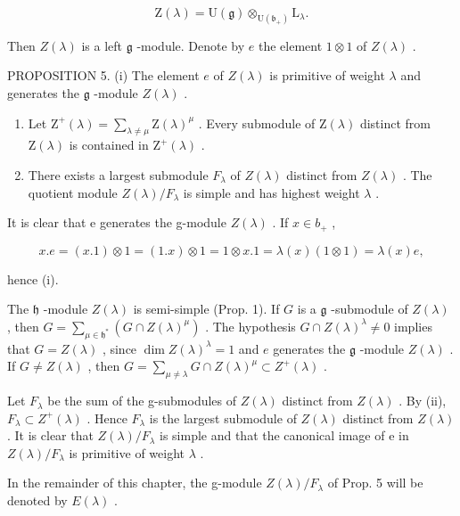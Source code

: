 \[
\mathrm{Z} (\lambda) = \mathrm{U} (\mathfrak {g}) \otimes_ {\mathrm{U} (\mathfrak {b} _ {+})} \mathrm{L} _ {\lambda}.\tag{2}
\]

Then \(Z(\lambda)\) is a left \(\mathfrak{g}\) -module. Denote by \(e\) the element \(1 \otimes 1\) of \(Z(\lambda)\) .

PROPOSITION 5. (i) The element \(e\) of \(Z(\lambda)\) is primitive of weight \(\lambda\) and generates the \(\mathfrak{g}\) -module \(Z(\lambda)\) .

\begin{enumerate}
\def\labelenumi{(\roman{enumi})}
\setcounter{enumi}{1}
\item
  Let \(\mathrm{Z}^{+}(\lambda) = \sum_{\lambda \neq \mu} \mathrm{Z}(\lambda)^{\mu}\) . Every submodule of \(\mathrm{Z}(\lambda)\) distinct from \(\mathrm{Z}(\lambda)\) is contained in \(\mathrm{Z}^{+}(\lambda)\) .
\item
  There exists a largest submodule \(F_{\lambda}\) of \(Z(\lambda)\) distinct from \(Z(\lambda)\) . The quotient module \(Z(\lambda)/F_{\lambda}\) is simple and has highest weight \(\lambda\) .
\end{enumerate}

It is clear that e generates the g-module \(Z(\lambda)\) . If \(x \in b_{+}\) ,

\[
x. e = (x. 1) \otimes 1 = (1. x) \otimes 1 = 1 \otimes x. 1 = \lambda (x) (1 \otimes 1) = \lambda (x) e,
\]

hence (i).

The \(\mathfrak{h}\) -module \(Z(\lambda)\) is semi-simple (Prop. 1). If \(G\) is a \(\mathfrak{g}\) -submodule of \(Z(\lambda)\) , then \(G = \sum_{\mu \in \mathfrak{h}^*}(G \cap Z(\lambda)^\mu)\) . The hypothesis \(G \cap Z(\lambda)^\lambda \neq 0\) implies that \(G = Z(\lambda)\) , since \(\dim Z(\lambda)^\lambda = 1\) and \(e\) generates the \(\mathfrak{g}\) -module \(Z(\lambda)\) . If \(G \neq Z(\lambda)\) , then \(G = \sum_{\mu \neq \lambda} G \cap Z(\lambda)^\mu \subset Z^+( \lambda)\) .

Let \(F_{\lambda}\) be the sum of the g-submodules of \(Z(\lambda)\) distinct from \(Z(\lambda)\) . By (ii), \(F_{\lambda} \subset Z^{+}(\lambda)\) . Hence \(F_{\lambda}\) is the largest submodule of \(Z(\lambda)\) distinct from \(Z(\lambda)\) . It is clear that \(Z(\lambda)/F_{\lambda}\) is simple and that the canonical image of e in \(Z(\lambda)/F_{\lambda}\) is primitive of weight \(\lambda\) .

In the remainder of this chapter, the g-module \(Z(\lambda)/F_{\lambda}\) of Prop. 5 will be denoted by \(E(\lambda)\) .

